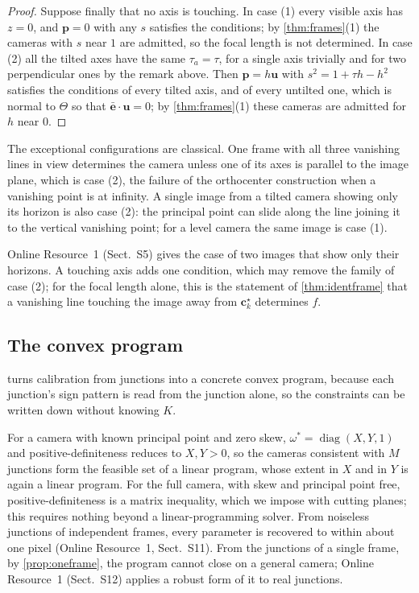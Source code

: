 \documentclass[pdflatex,sn-mathphys-num,iicol]{sn-jnl}
\newcommand{\vc}{\mathbf{c}}
\newcommand{\OR}{Online Resource~1}
\theoremstyle{thmstyleone}
\theoremstyle{thmstylethree}
\theoremstyle{thmstyletwo}
\begin{document}
\begin{proof}
Suppose finally that no axis is touching. In case (1) every visible axis has $z=0$, and $\mathbf p=0$ with any $s$ satisfies the conditions; by \cref{thm:frames}(1) the cameras with $s$ near $1$ are admitted, so the focal length is not determined. In case (2) all the tilted axes have the same $\tau_a=\tau$, for a single axis trivially and for two perpendicular ones by the remark above. Then $\mathbf p=h\mathbf u$ with $s^2=1+\tau h-h^2$ satisfies the conditions of every tilted axis, and of every untilted one, which is normal to $\Theta$ so that $\bar{\mathbf e}\cdot\mathbf u=0$; by \cref{thm:frames}(1) these cameras are admitted for $h$ near $0$.
\end{proof}

The exceptional configurations are classical. One frame with all three vanishing lines in view determines the camera unless one of its axes is parallel to the image plane, which is case (2), the failure of the orthocenter construction when a vanishing point is at infinity. A single image from a tilted camera showing only its horizon is also case (2): the principal point can slide along the line joining it to the vertical vanishing point; for a level camera the same image is case (1). 

\OR{} (Sect.~S5) gives the case of two images that show only their horizons. A touching axis adds one condition, which may remove the family of case (2); for the focal length alone, this is the statement of \cref{thm:identframe} that a vanishing line touching the image away from $\vc^{\star}_k$ determines $f$. 



\subsection{The convex program}\label{sec:program}

 turns calibration from junctions into a concrete convex program, because each junction's sign pattern is read from the junction alone, so the constraints can be written down without knowing $K$.

For a camera with known principal point and zero skew, $\omega^{*}=\operatorname{diag}(X,Y,1)$ and positive-definiteness reduces to $X,Y>0$, so the cameras consistent with $M$ junctions form the feasible set of a linear program, whose extent in $X$ and in $Y$ is again a linear program. For the full camera, with skew and principal point free, positive-definiteness is a matrix inequality, which we impose with cutting planes; this requires nothing beyond a linear-programming solver. From noiseless junctions of independent frames, every parameter is recovered to within about one pixel (\OR, Sect.~S11). From the junctions of a single frame, by \cref{prop:oneframe}, the program cannot close on a general camera; \OR{} (Sect.~S12) applies a robust form of it to real junctions.
\end{document}
